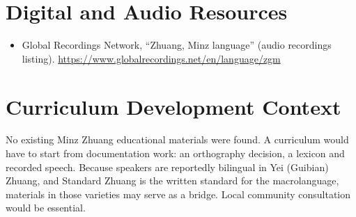 \documentclass[12pt]{article}
\begin{document}
\section{Digital and Audio Resources}
\begin{itemize}
\item Global Recordings Network, ``Zhuang, Minz language'' (audio recordings listing). \url{https://www.globalrecordings.net/en/language/zgm}
\end{itemize}

\section{Curriculum Development Context}
No existing Minz Zhuang educational materials were found. A curriculum would have to start from documentation work: an orthography decision, a lexicon and recorded speech. Because speakers are reportedly bilingual in Yei (Guibian) Zhuang, and Standard Zhuang is the written standard for the macrolanguage, materials in those varieties may serve as a bridge. Local community consultation would be essential.
\end{document}
